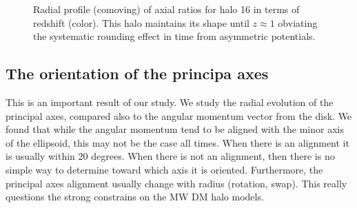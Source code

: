 \documentclass[a4paper,fleqn,usenatbib]{mnras}
\begin{document}
\begin{figure}
  \centering
  \hfill
  \caption{Radial profile (comoving) of axial ratios for halo 16 in terms of redshift (color). This halo maintains its shape until $z\approx 1$ obviating the systematic rounding effect in time from asymmetric potentials. }
  \label{fig:RedshiftGood}
\end{figure}

\subsection{The orientation of the principa axes}
This is an important result of our study. We study the radial evolution of the principal axes, compared also to the angular momentum vector from the disk. We found that while the angular momentum tend to be aligned with the minor axis of the ellipsoid, this may not be the case all times. When there is an alignment it is usually within 20 degrees. When there is not an alignment, then there is no simple way to determine toward which axis it is oriented. Furthermore, the principal axes alignment usually change with radius (rotation, swap). This really questions the strong constrains on the MW DM halo models. 
\end{document}
